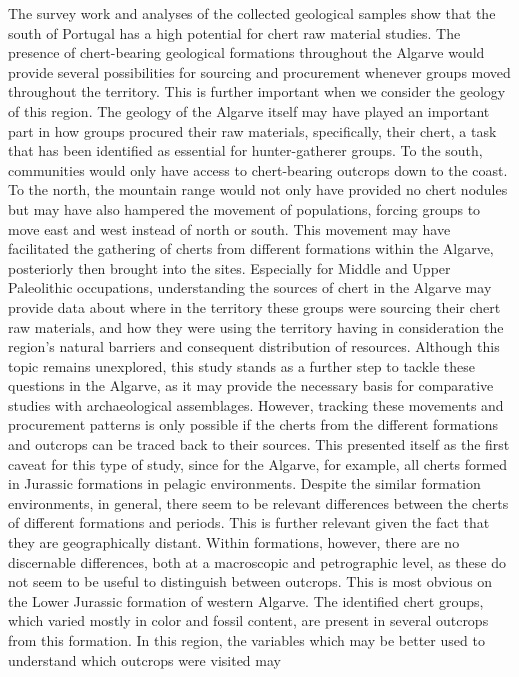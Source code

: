 \documentclass[
  a4paper,
  DIV=11,
  numbers=noendperiod]{scrreprt}
\begin{document}
The survey work and analyses of the collected geological samples show
that the south of Portugal has a high potential for chert raw material
studies. The presence of chert-bearing geological formations throughout
the Algarve would provide several possibilities for sourcing and
procurement whenever groups moved throughout the territory. This is
further important when we consider the geology of this region. The
geology of the Algarve itself may have played an important part in how
groups procured their raw materials, specifically, their chert, a task
that has been identified as essential for hunter-gatherer groups. To the
south, communities would only have access to chert-bearing outcrops down
to the coast. To the north, the mountain range would not only have
provided no chert nodules but may have also hampered the movement of
populations, forcing groups to move east and west instead of north or
south. This movement may have facilitated the gathering of cherts from
different formations within the Algarve, posteriorly then brought into
the sites. Especially for Middle and Upper Paleolithic occupations,
understanding the sources of chert in the Algarve may provide data about
where in the territory these groups were sourcing their chert raw
materials, and how they were using the territory having in consideration
the region's natural barriers and consequent distribution of resources.
Although this topic remains unexplored, this study stands as a further
step to tackle these questions in the Algarve, as it may provide the
necessary basis for comparative studies with archaeological assemblages.
However, tracking these movements and procurement patterns is only
possible if the cherts from the different formations and outcrops can be
traced back to their sources. This presented itself as the first caveat
for this type of study, since for the Algarve, for example, all cherts
formed in Jurassic formations in pelagic environments. Despite the
similar formation environments, in general, there seem to be relevant
differences between the cherts of different formations and periods. This
is further relevant given the fact that they are geographically distant.
Within formations, however, there are no discernable differences, both
at a macroscopic and petrographic level, as these do not seem to be
useful to distinguish between outcrops. This is most obvious on the
Lower Jurassic formation of western Algarve. The identified chert
groups, which varied mostly in color and fossil content, are present in
several outcrops from this formation. In this region, the variables
which may be better used to understand which outcrops were visited may
\end{document}

